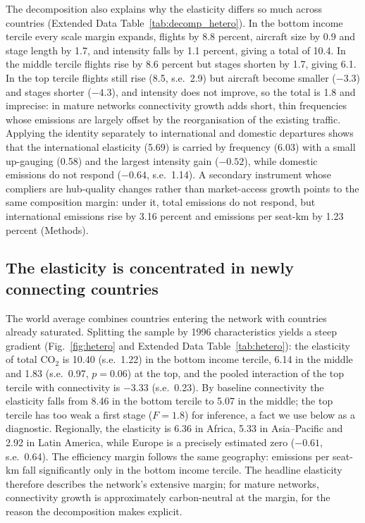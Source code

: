 \documentclass[12pt]{article}
\begin{document}
The decomposition also explains why the elasticity differs so much across
countries (Extended Data Table~\ref{tab:decomp_hetero}). In the bottom
income tercile every scale margin expands, flights by 8.8 percent, aircraft
size by 0.9 and stage length by 1.7, and intensity falls by 1.1 percent,
giving a total of 10.4. In the middle tercile flights rise by 8.6 percent
but stages shorten by 1.7, giving 6.1. In the top tercile flights still
rise (8.5, s.e.\ 2.9) but aircraft become smaller ($-3.3$) and stages
shorter ($-4.3$), and intensity does not improve, so the total is 1.8 and
imprecise: in mature networks connectivity growth adds short, thin
frequencies whose emissions are largely offset by the reorganisation of
the existing traffic. Applying the identity separately to international
and domestic departures shows that the international elasticity (5.69) is
carried by frequency (6.03) with a small up-gauging (0.58) and the largest
intensity gain ($-0.52$), while domestic emissions do not respond
($-0.64$, s.e.\ 1.14). A secondary instrument whose compliers are
hub-quality changes rather than market-access growth points to the same
composition margin: under it, total emissions do not respond, but
international emissions rise by 3.16 percent and emissions per seat-km by
1.23 percent (Methods).

\subsection*{The elasticity is concentrated in newly connecting countries}
The world average combines countries entering the network with countries
already saturated. Splitting the sample by 1996 characteristics yields a
steep gradient (Fig.~\ref{fig:hetero} and Extended Data
Table~\ref{tab:hetero}): the elasticity of total CO$_2$ is 10.40 (s.e.\
1.22) in the bottom income tercile, 6.14 in the middle and 1.83 (s.e.\
0.97, $p = 0.06$) at the top, and the pooled interaction of the top tercile
with connectivity is $-3.33$ (s.e.\ 0.23). By baseline connectivity the
elasticity falls from 8.46 in the bottom tercile to 5.07 in the middle; the
top tercile has too weak a first stage ($F = 1.8$) for inference, a fact we
use below as a diagnostic. Regionally, the elasticity is 6.36 in Africa,
5.33 in Asia--Pacific and 2.92 in Latin America, while Europe is a
precisely estimated zero ($-0.61$, s.e.\ 0.64). The efficiency margin
follows the same geography: emissions per seat-km fall significantly only
in the bottom income tercile. The headline elasticity therefore describes
the network's extensive margin; for mature networks, connectivity growth is
approximately carbon-neutral at the margin, for the reason the
decomposition makes explicit.
\end{document}
